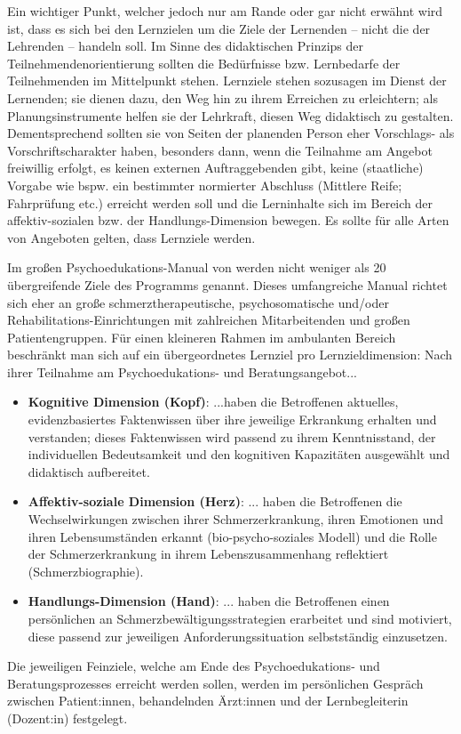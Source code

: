 \documentclass[
  twoside,
  parskip=half-,
]{scrreprt}
\begin{document}
Ein wichtiger Punkt, welcher jedoch nur am Rande \autocite[vgl.][99]{schlutz} oder gar nicht erwähnt wird \autocite[vgl.][]{reich-claassen} ist, dass es sich bei den Lernzielen um die Ziele der Lernenden -- nicht die der Lehrenden -- handeln soll. Im Sinne des didaktischen Prinzips der Teilnehmendenorientierung sollten die Bedürfnisse bzw. Lernbedarfe der Teilnehmenden im Mittelpunkt stehen. Lernziele stehen sozusagen im Dienst der Lernenden; sie dienen dazu, den Weg hin zu ihrem Erreichen zu erleichtern; als Planungsinstrumente helfen sie der Lehrkraft, diesen Weg didaktisch zu gestalten. Dementsprechend sollten sie von Seiten der planenden Person eher Vorschlags- als Vorschriftscharakter haben, besonders dann, wenn die Teilnahme am Angebot freiwillig erfolgt, es keinen externen Auftraggebenden gibt, keine (staatliche) Vorgabe wie bspw. ein bestimmter normierter Abschluss (Mittlere Reife; Fahrprüfung etc.) erreicht werden soll und die Lerninhalte sich im Bereich der affektiv-sozialen bzw. der Handlungs-Dimension bewegen. Es sollte für alle Arten von Angeboten gelten, dass Lernziele  werden. 

\begin{praxis}
  Im großen Psychoedukations-Manual von \citeauthor{wachter} werden nicht weniger als 20 übergreifende Ziele des Programms genannt. Dieses umfangreiche Manual richtet sich eher an große schmerztherapeutische, psychosomatische und/oder Rehabilitations-Einrichtungen mit zahlreichen Mitarbeitenden und großen Patientengruppen. Für einen kleineren Rahmen im ambulanten Bereich beschränkt man sich auf ein übergeordnetes Lernziel pro Lernzieldimension:
  Nach ihrer Teilnahme am Psychoedukations- und Beratungsangebot...
  \begin{itemize}
    \item \textbf{Kognitive Dimension (Kopf)}: ...haben die Betroffenen aktuelles, evidenzbasiertes Faktenwissen über ihre jeweilige Erkrankung erhalten und verstanden; dieses Faktenwissen wird passend zu ihrem Kenntnisstand, der individuellen Bedeutsamkeit und den kognitiven Kapazitäten ausgewählt und didaktisch aufbereitet. 
    \item \textbf{Affektiv-soziale Dimension (Herz)}: ... haben die Betroffenen die Wechselwirkungen zwischen ihrer Schmerzerkrankung, ihren Emotionen und ihren Lebensumständen erkannt (bio-psycho-soziales Modell) und die Rolle der Schmerzerkrankung in ihrem Lebenszusammenhang reflektiert (Schmerzbiographie).
    \item \textbf{Handlungs-Dimension (Hand)}: ... haben die Betroffenen einen persönlichen  an Schmerzbewältigungsstrategien erarbeitet und sind motiviert, diese passend zur jeweiligen Anforderungssituation selbstständig einzusetzen.
  \end{itemize}

  Die jeweiligen Feinziele, welche am Ende des Psychoedukations- und Beratungsprozesses erreicht werden sollen, werden im persönlichen Gespräch zwischen Patient:innen, behandelnden Ärzt:innen und der Lernbegleiterin (Dozent:in) festgelegt. 
\end{praxis}
\end{document}

